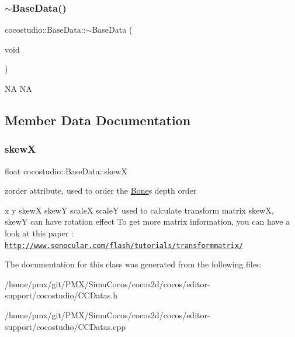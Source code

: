 \subsubsection{\texorpdfstring{$\sim$\+Base\+Data()}{~BaseData()}\hspace{0.1cm}{\footnotesize\ttfamily [2/2]}}
{\footnotesize\ttfamily cocostudio\+::\+Base\+Data\+::$\sim$\+Base\+Data (\begin{DoxyParamCaption}\item[{void}]{ }\end{DoxyParamCaption})}

NA  NA 

\subsection{Member Data Documentation}
\mbox{\label{classcocostudio_1_1BaseData_af54c45a63e59420ba37ae0ee83cd82ed}} 
\subsubsection{\texorpdfstring{skewX}{skewX}}
{\footnotesize\ttfamily float cocostudio\+::\+Base\+Data\+::skewX}



zorder attribute, used to order the \hyperlink{classcocostudio_1_1Bone}{Bone}\textquotesingle{}s depth order 

x y skewX skewY scaleX scaleY used to calculate transform matrix skewX, skewY can have rotation effect To get more matrix information, you can have a look at this paper \+: \href{http://www.senocular.com/flash/tutorials/transformmatrix/}{\tt http\+://www.\+senocular.\+com/flash/tutorials/transformmatrix/} 

The documentation for this class was generated from the following files\+:\begin{DoxyCompactItemize}
\item 
/home/pmx/git/\+P\+M\+X/\+Simu\+Cocos/cocos2d/cocos/editor-\/support/cocostudio/C\+C\+Datas.\+h\item 
/home/pmx/git/\+P\+M\+X/\+Simu\+Cocos/cocos2d/cocos/editor-\/support/cocostudio/C\+C\+Datas.\+cpp\end{DoxyCompactItemize}
